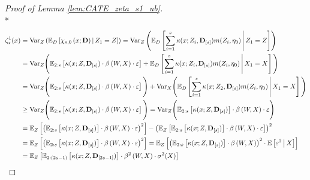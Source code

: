 \begin{proof}[Proof of Lemma \ref{lem:CATE_zeta_s1_ub}]\mbox{}\\*
     \begin{equation}
         \begin{aligned}
            \zeta_{s}^{1}(x)
            & = \Var_{Z}\left(\E_{D}\left[\chi_{s,0}\left(x; \mathbf{D}\right) \, \middle| \, Z_{1} = Z\right]\right)
            = \Var_{Z}\left(\E_{D}\left[
                \sum_{i = 1}^{s}\kappa(x; Z_{i}, \mathbf{D}_{[s]}) 
                m(Z_{i}, \eta_{0})
            \, \middle| \, Z_{1} = Z\right]\right) \\
            & = \Var_{Z}\Bigg(
                \E_{2:s}\left[\kappa(x; Z, \mathbf{D}_{[s]}) \cdot \beta\left(W, X\right) \cdot \varepsilon\right]
                + \E_{D}\left[\sum_{i = 1}^{s}\kappa(x; Z_{i}, \mathbf{D}_{[s]})m(Z_{i}, \eta_{0})
                \, \middle| \, X_{1} = X\right]
            \Bigg) \\
            & = \Var_{Z}\Bigg(
                \E_{2:s}\left[\kappa(x; Z, \mathbf{D}_{[s]}) \cdot \beta\left(W, X\right) \cdot \varepsilon\right]\Bigg) 
                + \Var_{X}\Bigg(\E_{D}\left[\sum_{i = 1}^{s}\kappa(x; Z_{2}, \mathbf{D}_{[s]})m(Z_{i}, \eta_{0})
                \, \middle| \, X_{1} = X\right]
            \Bigg) \\
            & \geq \Var_{Z}\Bigg(\E_{2:s}\left[\kappa(x; Z, \mathbf{D}_{[s]}) \cdot \beta\left(W, X\right) \cdot \varepsilon\right]\Bigg) 
            = \Var_{Z}\Bigg(\E_{2:s}\left[\kappa(x; Z, \mathbf{D}_{[s]})\right] \cdot \beta\left(W, X\right) \cdot \varepsilon \Bigg)\\
            & = \E_{Z}\left[\left(\E_{2:s}\left[\kappa(x; Z, \mathbf{D}_{[s]})\right] \cdot \beta\left(W, X\right) \cdot \varepsilon\right)^2\right]
            - \left(\E_{Z}\left[\E_{2:s}\left[\kappa(x; Z, \mathbf{D}_{[s]})\right] \cdot \beta\left(W, X\right) \cdot \varepsilon\right]\right)^{2} \\
            & = \E_{Z}\left[\left(\E_{2:s}\left[\kappa(x; Z, \mathbf{D}_{[s]})\right] \cdot \beta\left(W, X\right) \cdot \varepsilon\right)^2\right]
            = \E_{Z}\left[\left(\E_{2:s}\left[\kappa(x; Z, \mathbf{D}_{[s]})\right] \cdot \beta\left(W, X\right)\right)^2 \cdot \E\left[\varepsilon^{2} \, \middle| \, X\right]\right]\\
            & = \E_{Z}\left[\E_{2:(2s-1)}\left[\kappa(x; Z, \mathbf{D}_{[2s - 1]})\right] \cdot \beta^{2}\left(W, X\right) \cdot \sigma^{2}(X)\right]\\

\end{aligned}
\end{equation}
\end{proof}
